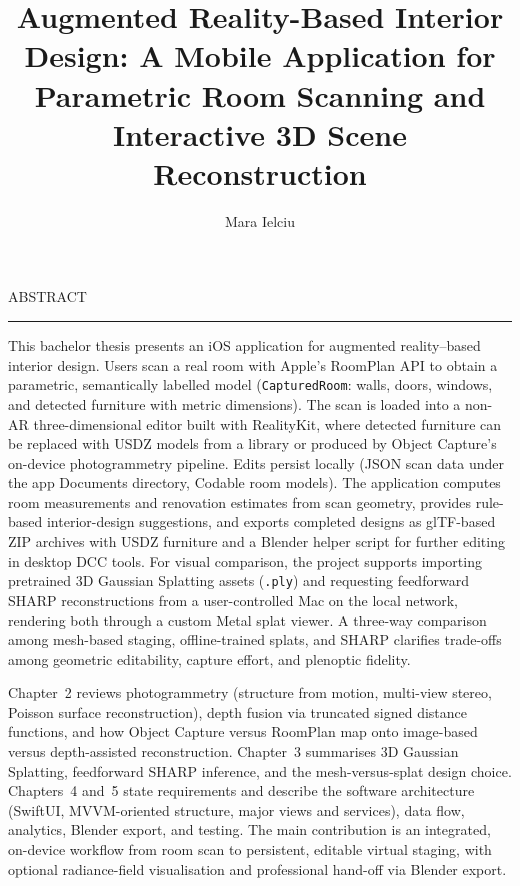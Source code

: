 \documentclass[12pt]{report}
\begin{document}
\title{Augmented Reality-Based Interior Design: A Mobile Application for Parametric Room Scanning and Interactive 3D Scene Reconstruction}
\author{Mara Ielciu}

\maketitle

\newpage
\thispagestyle{empty}
\mbox{}
\newpage
{}

\cleardoublepage
ABSTRACT
\vspace{0.5cm}
\hrule
\vspace{0.5cm}

This bachelor thesis presents an iOS application for augmented reality--based interior design. Users scan a real room with Apple's RoomPlan API to obtain a parametric, semantically labelled model (\texttt{CapturedRoom}: walls, doors, windows, and detected furniture with metric dimensions). The scan is loaded into a non-AR three-dimensional editor built with RealityKit, where detected furniture can be replaced with USDZ models from a library or produced by Object Capture's on-device photogrammetry pipeline. Edits persist locally (JSON scan data under the app Documents directory, Codable room models). The application computes room measurements and renovation estimates from scan geometry, provides rule-based interior-design suggestions, and exports completed designs as glTF-based ZIP archives with USDZ furniture and a Blender helper script for further editing in desktop DCC tools. For visual comparison, the project supports importing pretrained 3D Gaussian Splatting assets (\texttt{.ply}) and requesting feedforward SHARP reconstructions from a user-controlled Mac on the local network, rendering both through a custom Metal splat viewer. A three-way comparison among mesh-based staging, offline-trained splats, and SHARP clarifies trade-offs among geometric editability, capture effort, and plenoptic fidelity.

Chapter~2 reviews photogrammetry (structure from motion, multi-view stereo, Poisson surface reconstruction), depth fusion via truncated signed distance functions, and how Object Capture versus RoomPlan map onto image-based versus depth-assisted reconstruction. Chapter~3 summarises 3D Gaussian Splatting, feedforward SHARP inference, and the mesh-versus-splat design choice. Chapters~4 and~5 state requirements and describe the software architecture (SwiftUI, MVVM-oriented structure, major views and services), data flow, analytics, Blender export, and testing. The main contribution is an integrated, on-device workflow from room scan to persistent, editable virtual staging, with optional radiance-field visualisation and professional hand-off via Blender export.
\end{document}
